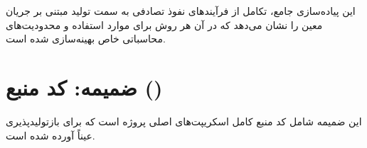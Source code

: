 این پیاده‌سازی جامع، تکامل از فرآیندهای نفوذ تصادفی به سمت تولید مبتنی بر جریان معین را نشان می‌دهد که در آن هر روش برای موارد استفاده و محدودیت‌های محاسباتی خاص بهینه‌سازی شده است.

\newpage
\section{ضمیمه: کد منبع ()}
این ضمیمه شامل کد منبع کامل اسکریپت‌های اصلی پروژه است که برای بازتولیدپذیری عیناً آورده شده است.

\subsection{}
